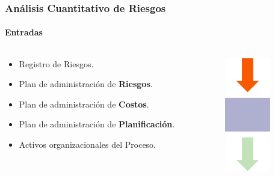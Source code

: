 \frame
{
\frametitle{Análisis Cuantitativo de Riesgos}
\framesubtitle{Entradas}
\begin{columns}
	\begin{column}{0.8\textwidth}
		\begin{itemize}
			\item<1-> Registro de Riesgos.
			\item<2-> Plan de administración de \textbf{Riesgos}.
			\item<3-> Plan de administración de \textbf{Costos}.
			\item<4-> Plan de administración de \textbf{Planificación}.
			\item<5-> Activos organizacionales del Proceso.
		\end{itemize}
	\end{column}
	\begin{column}{0.2\textwidth}
		\includegraphics[width=2cm]{img/input}
	\end{column}
\end{columns}
}

